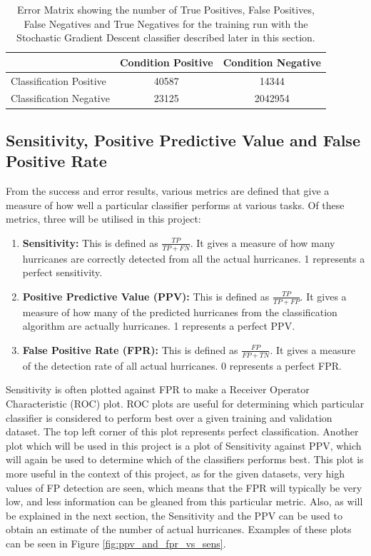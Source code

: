 \documentclass[pdftex,12pt,a4paper]{report}
\begin{document}
\begin{table}[ht!]
    \centering
    \begin{tabular}{ l | c c }
                                & Condition Positive & Condition Negative \\
        \hline
        Classification Positive & \SI{40587}{} & \SI{14344}{} \\
        Classification Negative & \SI{23125}{} & \SI{2042954}{} \\
    \end{tabular}
    \caption{Error Matrix showing the number of True Positives, False Positives, False Negatives and
        True Negatives for the training run with the Stochastic Gradient Descent classifier described
        later in this section. }
    \label{tab:tf_np_table}
\end{table}

\newpage
\subsection{Sensitivity, Positive Predictive Value and False Positive Rate}

From the success and error results, various metrics are defined that give a measure of how well a
particular classifier performs at various tasks. Of these metrics, three will be utilised in this
project:

\begin{enumerate}
    \item \textbf{Sensitivity:} This is defined as $\frac{TP}{TP + FN}$. It gives a measure of how
        many hurricanes are correctly detected from all the actual hurricanes. 1 represents a
        perfect sensitivity.
    \item \textbf{Positive Predictive Value (PPV):} This is defined as $\frac{TP}{TP + FP}$. It
        gives a measure of how many of the predicted hurricanes from the classification algorithm
        are actually hurricanes. 1 represents a perfect PPV.
    \item \textbf{False Positive Rate (FPR):} This is defined as $\frac{FP}{FP + TN}$. It gives a
        measure of the detection rate of all actual hurricanes. 0 represents a perfect FPR.
\end{enumerate}

Sensitivity is often plotted against FPR to make a Receiver Operator Characteristic (ROC)  plot.
ROC plots are useful for determining which particular classifier is considered to perform best over
a given training and validation dataset. The top left corner of this plot represents perfect
classification. Another plot which will be used in this project is a plot of Sensitivity against
PPV, which will again be used to determine which of the classifiers performs best. This plot is more
useful in the context of this project, as for the given datasets, very high values of FP detection
are seen, which means that the FPR will typically be very low, and less information can be gleaned
from this particular metric. Also, as will be explained in the next section, the Sensitivity and the
PPV can be used to obtain an estimate of the number of actual hurricanes. Examples of these plots
can be seen in Figure \ref{fig:ppv_and_fpr_vs_sens}.
\end{document}
